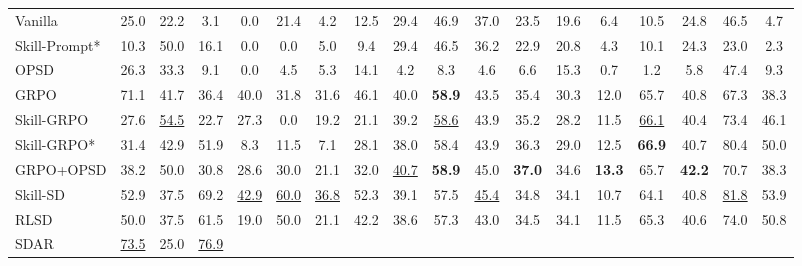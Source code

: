 \begin{table}[ht!]
{\begin{tabular}{l ccccccc cccccccc cc}
    Vanilla
        & 25.0 & 22.2 & 3.1 & 0.0 & 21.4 & 4.2 & 12.5
        & 29.4 & 46.9 & 37.0 & 23.5 & 19.6 & 6.4 & 10.5 & 24.8
        & 46.5 & 4.7
        \\
    Skill-Prompt*
        & 10.3 & 50.0 & 16.1 & 0.0 & 0.0 & 5.0 & 9.4
        & 29.4 & 46.5 & 36.2 & 22.9 & 20.8 & 4.3 & 10.1 & 24.3
        & 23.0 & 2.3
        \\
    OPSD
        & 26.3 & 33.3 & 9.1 & 0.0 & 4.5 & 5.3 & 14.1
        & 4.2 & 8.3 & 4.6 & 6.6 & 15.3 & 0.7 & 1.2 & 5.8
        & 47.4 & 9.3
        \\
    GRPO
        & 71.1 & 41.7 & 36.4 & 40.0 & 31.8 & 31.6 & 46.1
        & 40.0
        & \cellcolor{topcolor}\textbf{58.9}
        & 43.5 & 35.4 & 30.3 & 12.0 & 65.7 & 40.8
        & 67.3 & 38.3
        \\
    Skill-GRPO
        & 27.6
        & \cellcolor{secondcolor}\underline{54.5}
        & 22.7 & 27.3 & 0.0 & 19.2 & 21.1
        & 39.2
        & \cellcolor{secondcolor}\underline{58.6}
        & 43.9 & 35.2 & 28.2 & 11.5
        & \cellcolor{secondcolor}\underline{66.1}
        & 40.4
        & 73.4 & 46.1
        \\
    Skill-GRPO*
        & 31.4 & 42.9 & 51.9 & 8.3 & 11.5 & 7.1 & 28.1
        & 38.0 & 58.4 & 43.9 & 36.3 & 29.0 & 12.5
        & \cellcolor{topcolor}\textbf{66.9}
        & 40.7
        & 80.4 & 50.0
        \\
    GRPO+OPSD
        & 38.2 & 50.0 & 30.8 & 28.6 & 30.0 & 21.1 & 32.0
        & \cellcolor{secondcolor}\underline{40.7}
        & \cellcolor{topcolor}\textbf{58.9}
        & 45.0
        & \cellcolor{topcolor}\textbf{37.0}
        & 34.6
        & \cellcolor{topcolor}\textbf{13.3}
        & 65.7
        & \cellcolor{topcolor}\textbf{42.2}
        & 70.7 & 38.3
        \\
    Skill-SD
        & 52.9 & 37.5 & 69.2
        & \cellcolor{secondcolor}\underline{42.9}
        & \cellcolor{secondcolor}\underline{60.0}
        & \cellcolor{secondcolor}\underline{36.8}
        & 52.3
        & 39.1 & 57.5
        & \cellcolor{secondcolor}\underline{45.4}
        & 34.8 & 34.1 & 10.7 & 64.1 & 40.8
        & \cellcolor{secondcolor}\underline{81.8}
        & 53.9
        \\
    RLSD
        & 50.0 & 37.5 & 61.5 & 19.0 & 50.0 & 21.1 & 42.2
        & 38.6 & 57.3 & 43.0 & 34.5 & 34.1 & 11.5 & 65.3 & 40.6
        & 74.0 & 50.8
        \\
    SDAR
        & \cellcolor{secondcolor}\underline{73.5}
        & 25.0
        & \cellcolor{secondcolor}\underline{76.9}

\end{tabular}}
\end{table}
